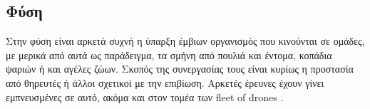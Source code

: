 \subsection{Φύση} \label{sec:Chapter1-2-1}
Στην φύση είναι αρκετά συχνή η ύπαρξη έμβιων οργανισμός που κινούνται σε ομάδες, με μερικά από αυτά ως παράδειγμα, τα σμήνη από πουλιά και
έντομα, κοπάδια ψαριών ή και αγέλες ζώων. Σκοπός της συνεργασίας τους είναι κυρίως η προστασία από θηρευτές ή άλλοι σχετικοί με την επιβίωση.
Αρκετές έρευνες έχουν γίνει εμπνευ\-σμένες σε αυτό, ακόμα και στον τομέα των fleet of drones
\cite{research-on-drone-swarms-move-like-animals} \cite{research-on-drone-swarms-move-like-animals-like-documentary} \cite{swarm-of-drones}.
  
